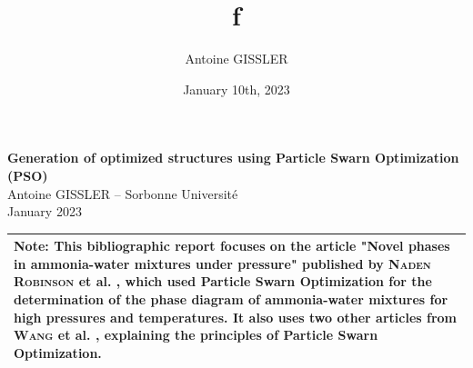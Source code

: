 \documentclass[11pt]{article}
\title{\textsf{\textbf{f}}}
\author{Antoine GISSLER}
\date{January 10th, 2023}
\begin{document}
\noindent\huge\textbf{\textsf{Generation of optimized structures using Particle Swarn Optimization (PSO)}}\normalsize\vspace{1em}\\
\large \textsf{Antoine GISSLER -- Sorbonne Université\\January 2023}\vspace{0.5em}\\
\begin{tabular}{p{18cm}}
    \hline
    \vspace{-0.25em}\begin{minipage}{\textwidth}
        \small\textbf{Note:} This bibliographic report focuses on the article "Novel phases in ammonia-water mixtures under pressure" published by \textsc{Naden Robinson} et al. \cite{original}, which used Particle Swarn Optimization for the determination of the phase diagram of ammonia-water mixtures for high pressures and temperatures. It also uses two other articles from \textsc{Wang} et al. \cite{PhysRevB.82.094116,WANG20122063}, explaining the principles of Particle Swarn Optimization.\normalsize
    \end{minipage}\vspace{0.5em}
    \\
    \hline
\end{tabular}
\end{document}
